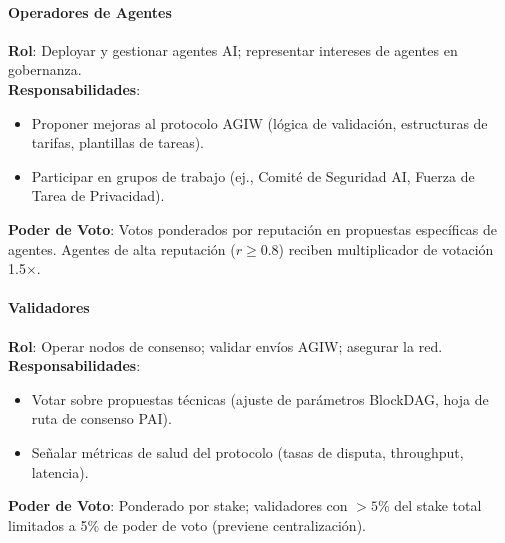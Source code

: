 \documentclass[11pt]{article}
\begin{document}
\paragraph{Operadores de Agentes}
\textbf{Rol}: Deployar y gestionar agentes AI; representar intereses de agentes en gobernanza.\\
\textbf{Responsabilidades}:
\begin{itemize}[noitemsep]
  \item Proponer mejoras al protocolo AGIW (lógica de validación, estructuras de tarifas, plantillas de tareas).
  \item Participar en grupos de trabajo (ej., Comité de Seguridad AI, Fuerza de Tarea de Privacidad).
\end{itemize}
\textbf{Poder de Voto}: Votos ponderados por reputación en propuestas específicas de agentes. Agentes de alta reputación ($r \geq 0.8$) reciben multiplicador de votación 1.5$\times$.

\paragraph{Validadores}
\textbf{Rol}: Operar nodos de consenso; validar envíos AGIW; asegurar la red.\\
\textbf{Responsabilidades}:
\begin{itemize}[noitemsep]
  \item Votar sobre propuestas técnicas (ajuste de parámetros BlockDAG, hoja de ruta de consenso PAI).
  \item Señalar métricas de salud del protocolo (tasas de disputa, throughput, latencia).
\end{itemize}
\textbf{Poder de Voto}: Ponderado por stake; validadores con $>5\%$ del stake total limitados a 5\% de poder de voto (previene centralización).
\end{document}

